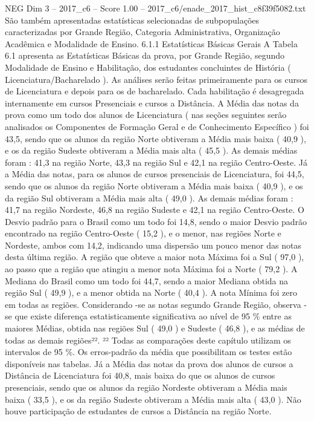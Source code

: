 \begin{textsample}{NEG Dim 3 – 2017\_c6 – Score 1.00 – 2017\_c6/enade\_2017\_hist\_c8f39f5082.txt}
São também apresentadas estatísticas selecionadas de subpopulações caracterizadas por Grande Região, Categoria Administrativa, Organização Acadêmica e Modalidade de Ensino. 6.1.1 Estatísticas Básicas Gerais A Tabela 6.1 apresenta as Estatísticas Básicas da prova, por Grande Região, segundo Modalidade de Ensino e Habilitação, dos estudantes concluintes de História ( Licenciatura/Bacharelado ).
As análises serão feitas primeiramente para os cursos de Licenciatura e depois para os de bacharelado.
Cada habilitação é desagregada internamente em cursos Presenciais e cursos a Distância.
A Média das notas da prova como um todo dos alunos de Licenciatura ( nas seções seguintes serão analisados os Componentes de Formação Geral e de Conhecimento Específico ) foi 43,5, sendo que os alunos da região Norte obtiveram a Média mais baixa ( 40,9 ), e os da região Sudeste obtiveram a Média mais alta ( 45,5 ).
As demais médias foram : 41,3 na região Norte, 43,3 na região Sul e 42,1 na região Centro-Oeste.
Já a Média das notas, para os alunos de cursos presenciais de Licenciatura, foi 44,5, sendo que os alunos da região Norte obtiveram a Média mais baixa ( 40,9 ), e os da região Sul obtiveram a Média mais alta ( 49,0 ).
As demais médias foram : 41,7 na região Nordeste, 46,8 na região Sudeste e 42,1 na região Centro-Oeste.
O Desvio padrão para o Brasil como um todo foi 14,8, sendo o maior Desvio padrão encontrado na região Centro-Oeste ( 15,2 ), e o menor, nas regiões Norte e Nordeste, ambos com 14,2, indicando uma dispersão um pouco menor das notas desta última região.
A região que obteve a maior nota Máxima foi a Sul ( 97,0 ), ao passo que a região que atingiu a menor nota Máxima foi a Norte ( 79,2 ).
A Mediana do Brasil como um todo foi 44,7, sendo a maior Mediana obtida na região Sul ( 49,9 ), e a menor obtida na Norte ( 40,4 ).
A nota Mínima foi zero em todas as regiões.
Considerando -se as notas segundo Grande Região, observa -se que existe diferença estatisticamente significativa ao nível de 95 \% entre as maiores Médias, obtida nas regiões Sul ( 49,0 ) e Sudeste ( 46,8 ), e as médias de todas as demais regiões²². ²² Todas as comparações deste capítulo utilizam os intervalos de 95 \%.
Os erros-padrão da média que possibilitam os testes estão disponíveis nas tabelas.
Já a Média das notas da prova dos alunos de cursos a Distância de Licenciatura foi 40,8, mais baixa do que os alunos de cursos presenciais, sendo que os alunos da região Nordeste obtiveram a Média mais baixa ( 33,5 ), e os da região Sudeste obtiveram a Média mais alta ( 43,0 ).
Não houve participação de estudantes de cursos a Distância na região Norte.

\end{textsample}

